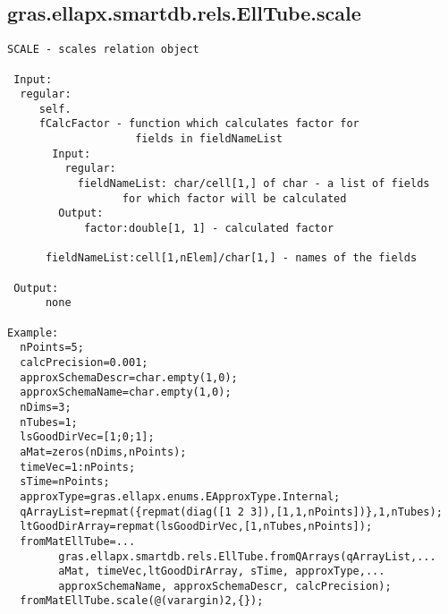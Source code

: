 \subsection{\texorpdfstring{gras.ellapx.smartdb.rels.EllTube.scale}{scale}}\label{method:gras.ellapx.smartdb.rels.EllTube.scale}
\begin{verbatim}
SCALE - scales relation object

 Input:
  regular:
     self.
     fCalcFactor - function which calculates factor for
                    fields in fieldNameList
       Input:
         regular:
           fieldNameList: char/cell[1,] of char - a list of fields
                  for which factor will be calculated
        Output:
            factor:double[1, 1] - calculated factor

      fieldNameList:cell[1,nElem]/char[1,] - names of the fields

 Output:
      none

Example:
  nPoints=5;
  calcPrecision=0.001;
  approxSchemaDescr=char.empty(1,0);
  approxSchemaName=char.empty(1,0);
  nDims=3;
  nTubes=1;
  lsGoodDirVec=[1;0;1];
  aMat=zeros(nDims,nPoints);
  timeVec=1:nPoints;
  sTime=nPoints;
  approxType=gras.ellapx.enums.EApproxType.Internal;
  qArrayList=repmat({repmat(diag([1 2 3]),[1,1,nPoints])},1,nTubes);
  ltGoodDirArray=repmat(lsGoodDirVec,[1,nTubes,nPoints]);
  fromMatEllTube=...
        gras.ellapx.smartdb.rels.EllTube.fromQArrays(qArrayList,...
        aMat, timeVec,ltGoodDirArray, sTime, approxType,...
        approxSchemaName, approxSchemaDescr, calcPrecision);
  fromMatEllTube.scale(@(varargin)2,{});
\end{verbatim}
